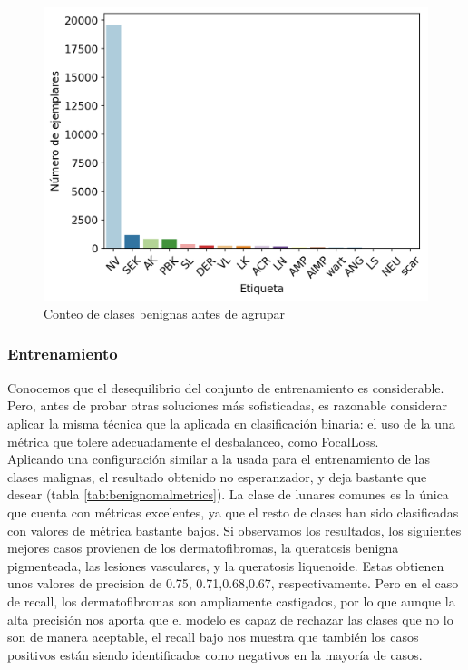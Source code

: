 \begin{figure}[H]
	\centering
	\includegraphics[scale = 0.7]{imagenes/countbenign.png}
	\caption{Conteo de clases benignas antes de agrupar}
	\label {fig:buenas}
\end{figure}

\subsubsection{Entrenamiento}

Conocemos que el desequilibrio del conjunto de entrenamiento es considerable. Pero, antes de probar otras soluciones más sofisticadas, es razonable considerar aplicar la misma técnica que la aplicada en clasificación binaria: el uso de la una métrica que tolere adecuadamente el desbalanceo, como FocalLoss.\\

Aplicando una configuración similar a la usada para el entrenamiento de las clases malignas, el resultado obtenido no esperanzador, y deja bastante que desear  (tabla \ref{tab:benignomalmetrics}). La clase de lunares comunes es la única que cuenta con métricas excelentes, ya que el resto de clases han sido clasificadas con valores de métrica bastante bajos. Si observamos los resultados,  los siguientes mejores casos provienen de los dermatofibromas, la queratosis benigna pigmenteada,  las lesiones vasculares, y la queratosis liquenoide. Estas obtienen unos valores de precision de 0.75, 0.71,0.68,0.67, respectivamente. Pero en el caso de recall, los dermatofibromas son ampliamente castigados, por lo que aunque la alta precisión nos aporta que el modelo es capaz de rechazar las clases que no lo son de manera aceptable, el recall bajo nos muestra que también los casos positivos están siendo identificados como negativos en la mayoría de casos.

